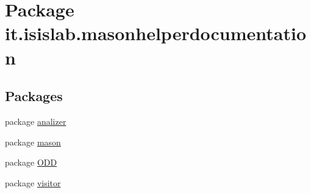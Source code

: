 \hypertarget{namespaceit_1_1isislab_1_1masonhelperdocumentation}{\section{Package it.\-isislab.\-masonhelperdocumentation}
\label{namespaceit_1_1isislab_1_1masonhelperdocumentation}
}
\subsection*{Packages}
\begin{DoxyCompactItemize}
\item 
package \hyperlink{namespaceit_1_1isislab_1_1masonhelperdocumentation_1_1analizer}{analizer}
\item 
package \hyperlink{namespaceit_1_1isislab_1_1masonhelperdocumentation_1_1mason}{mason}
\item 
package \hyperlink{namespaceit_1_1isislab_1_1masonhelperdocumentation_1_1_o_d_d}{O\-D\-D}
\item 
package \hyperlink{namespaceit_1_1isislab_1_1masonhelperdocumentation_1_1visitor}{visitor}
\end{DoxyCompactItemize}
